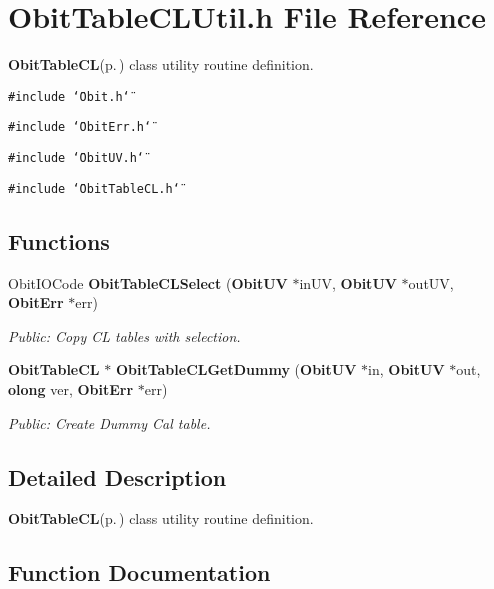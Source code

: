 \section{Obit\-Table\-CLUtil.h File Reference}
\label{ObitTableCLUtil_8h}
{\bf Obit\-Table\-CL}{\rm (p.\,\pageref{structObitTableCL})} class utility routine definition. 

{\tt \#include \char`\"{}Obit.h\char`\"{}}\par
{\tt \#include \char`\"{}Obit\-Err.h\char`\"{}}\par
{\tt \#include \char`\"{}Obit\-UV.h\char`\"{}}\par
{\tt \#include \char`\"{}Obit\-Table\-CL.h\char`\"{}}\par
\subsection*{Functions}
\begin{CompactItemize}
\item 
Obit\-IOCode {\bf Obit\-Table\-CLSelect} ({\bf Obit\-UV} $\ast$in\-UV, {\bf Obit\-UV} $\ast$out\-UV, {\bf Obit\-Err} $\ast$err)
\begin{CompactList}\small\item\em Public: Copy CL tables with selection. \item\end{CompactList}\item 
{\bf Obit\-Table\-CL} $\ast$ {\bf Obit\-Table\-CLGet\-Dummy} ({\bf Obit\-UV} $\ast$in, {\bf Obit\-UV} $\ast$out, {\bf olong} ver, {\bf Obit\-Err} $\ast$err)
\begin{CompactList}\small\item\em Public: Create Dummy Cal table. \item\end{CompactList}\end{CompactItemize}


\subsection{Detailed Description}
{\bf Obit\-Table\-CL}{\rm (p.\,\pageref{structObitTableCL})} class utility routine definition. 



\subsection{Function Documentation}
